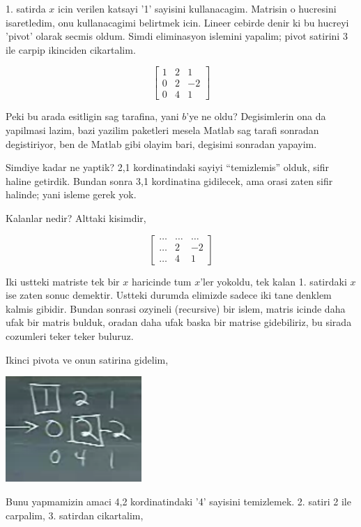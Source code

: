 \documentclass[12pt,fleqn]{article}\usepackage{../common}
\begin{document}
1. satirda $x$ icin verilen katsayi '1' sayisini kullanacagim. Matrisin o
hucresini isaretledim, onu kullanacagimi belirtmek icin. Lineer cebirde
denir ki bu hucreyi 'pivot' olarak secmis oldum. Simdi eliminasyon islemini
yapalim; pivot satirini 3 ile carpip ikinciden cikartalim.

$$ 
\left[\begin{array}{rrr}
    1 & 2 & 1 \\
    0 & 2 & -2 \\
    0 & 4 & 1
  \end{array}\right]
$$

Peki bu arada esitligin sag tarafina, yani $b$'ye ne oldu? Degisimlerin ona
da yapilmasi lazim, bazi yazilim paketleri mesela Matlab sag tarafi
sonradan degistiriyor, ben de Matlab gibi olayim bari, degisimi sonradan
yapayim. 

Simdiye kadar ne yaptik? 2,1 kordinatindaki sayiyi ``temizlemis'' olduk,
sifir haline getirdik. Bundan sonra 3,1 kordinatina gidilecek, ama orasi
zaten sifir halinde; yani isleme gerek yok. 

Kalanlar nedir? Alttaki kisimdir,

$$ 
\left[\begin{array}{rrr}
    \dots & \dots & \dots \\
    \dots &  2 & -2 \\
    \dots & 4 &  1
  \end{array}\right]
$$

Iki ustteki matriste tek bir $x$ haricinde tum $x$'ler yokoldu, tek kalan
1. satirdaki $x$ ise zaten sonuc demektir. Ustteki durumda elimizde sadece
iki tane denklem kalmis gibidir. Bundan sonrasi ozyineli (recursive) bir
islem, matris icinde daha ufak bir matris bulduk, oradan daha ufak baska
bir matrise gidebiliriz, bu sirada cozumleri teker teker buluruz.

Ikinci pivota ve onun satirina gidelim,

\includegraphics[height=4cm]{2_02.png}

Bunu yapmamizin amaci 4,2 kordinatindaki '4' sayisini temizlemek. 2. satiri
2 ile carpalim, 3. satirdan cikartalim,
\end{document}
